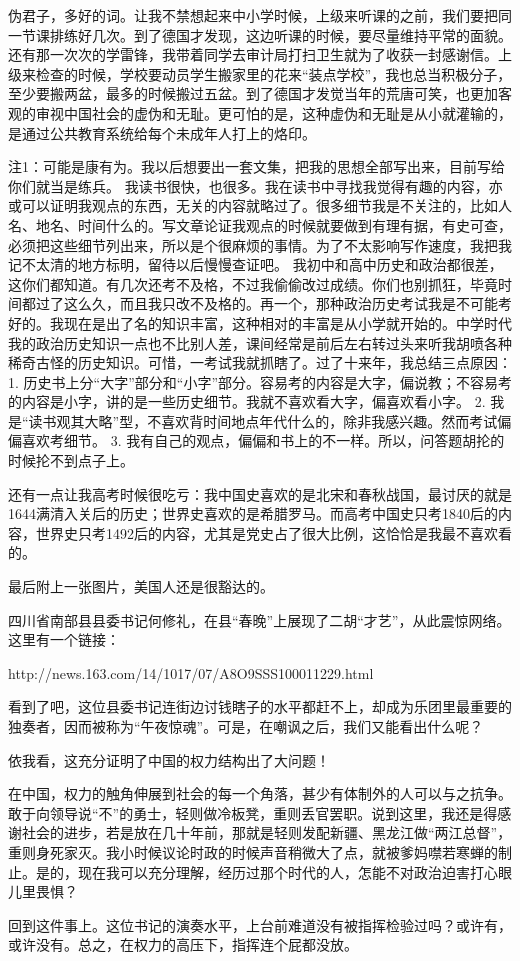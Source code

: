 伪君子，多好的词。让我不禁想起来中小学时候，上级来听课的之前，我们要把同一节课排练好几次。到了德国才发现，这边听课的时候，要尽量维持平常的面貌。还有那一次次的学雷锋，我带着同学去审计局打扫卫生就为了收获一封感谢信。上级来检查的时候，学校要动员学生搬家里的花来“装点学校”，我也总当积极分子，至少要搬两盆，最多的时候搬过五盆。到了德国才发觉当年的荒唐可笑，也更加客观的审视中国社会的虚伪和无耻。更可怕的是，这种虚伪和无耻是从小就灌输的，是通过公共教育系统给每个未成年人打上的烙印。

注1：可能是康有为。我以后想要出一套文集，把我的思想全部写出来，目前写给你们就当是练兵。
我读书很快，也很多。我在读书中寻找我觉得有趣的内容，亦或可以证明我观点的东西，无关的内容就略过了。很多细节我是不关注的，比如人名、地名、时间什么的。写文章论证我观点的时候就要做到有理有据，有史可查，必须把这些细节列出来，所以是个很麻烦的事情。为了不太影响写作速度，我把我记不太清的地方标明，留待以后慢慢查证吧。
我初中和高中历史和政治都很差，这你们都知道。有几次还考不及格，不过我偷偷改过成绩。你们也别抓狂，毕竟时间都过了这么久，而且我只改不及格的。再一个，那种政治历史考试我是不可能考好的。我现在是出了名的知识丰富，这种相对的丰富是从小学就开始的。中学时代我的政治历史知识一点也不比别人差，课间经常是前后左右转过头来听我胡喷各种稀奇古怪的历史知识。可惜，一考试我就抓瞎了。过了十来年，我总结三点原因：
1. 历史书上分“大字”部分和“小字”部分。容易考的内容是大字，偏说教；不容易考的内容是小字，讲的是一些历史细节。我就不喜欢看大字，偏喜欢看小字。
2. 我是“读书观其大略”型，不喜欢背时间地点年代什么的，除非我感兴趣。然而考试偏偏喜欢考细节。
3. 我有自己的观点，偏偏和书上的不一样。所以，问答题胡抡的时候抡不到点子上。

还有一点让我高考时候很吃亏：我中国史喜欢的是北宋和春秋战国，最讨厌的就是1644满清入关后的历史；世界史喜欢的是希腊罗马。而高考中国史只考1840后的内容，世界史只考1492后的内容，尤其是党史占了很大比例，这恰恰是我最不喜欢看的。

最后附上一张图片，美国人还是很豁达的。

四川省南部县县委书记何修礼，在县“春晚”上展现了二胡“才艺”，从此震惊网络。这里有一个链接：

http://news.163.com/14/1017/07/A8O9SSS100011229.html

看到了吧，这位县委书记连街边讨钱瞎子的水平都赶不上，却成为乐团里最重要的独奏者，因而被称为“午夜惊魂”。可是，在嘲讽之后，我们又能看出什么呢？

依我看，这充分证明了中国的权力结构出了大问题！

在中国，权力的触角伸展到社会的每一个角落，甚少有体制外的人可以与之抗争。敢于向领导说“不”的勇士，轻则做冷板凳，重则丢官罢职。说到这里，我还是得感谢社会的进步，若是放在几十年前，那就是轻则发配新疆、黑龙江做“两江总督”，重则身死家灭。我小时候议论时政的时候声音稍微大了点，就被爹妈噤若寒蝉的制止。是的，现在我可以充分理解，经历过那个时代的人，怎能不对政治迫害打心眼儿里畏惧？

回到这件事上。这位书记的演奏水平，上台前难道没有被指挥检验过吗？或许有，或许没有。总之，在权力的高压下，指挥连个屁都没放。
